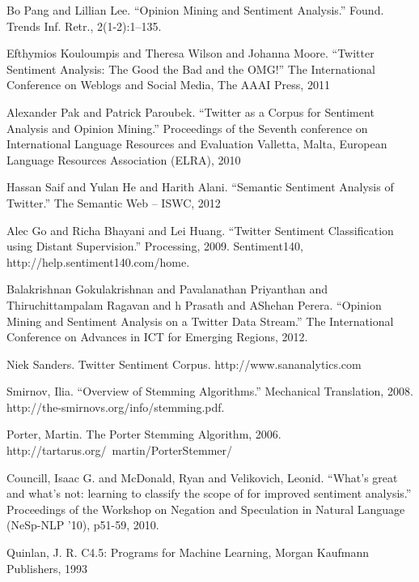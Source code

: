 	Bo Pang and Lillian Lee. “Opinion Mining and Sentiment Analysis.” Found. Trends Inf. Retr., 2(1-2):1–135.

	Efthymios Kouloumpis and Theresa Wilson and Johanna Moore. “Twitter Sentiment Analysis: The Good the Bad and the OMG!” The International Conference on Weblogs and Social Media, The AAAI Press, 2011

	Alexander Pak and Patrick Paroubek. “Twitter as a Corpus for Sentiment Analysis and Opinion Mining.” Proceedings of the Seventh conference on International Language Resources and Evaluation Valletta, Malta, European Language Resources Association (ELRA), 2010

	Hassan Saif and Yulan He and Harith Alani. “Semantic Sentiment Analysis of Twitter.” The Semantic Web – ISWC, 2012

	Alec Go and Richa Bhayani and Lei Huang. “Twitter Sentiment Classification
using Distant Supervision.” Processing, 2009. Sentiment140, http://help.sentiment140.com/home.

	Balakrishnan Gokulakrishnan and Pavalanathan Priyanthan and Thiruchittampalam Ragavan and h Prasath and AShehan Perera. “Opinion Mining and Sentiment Analysis on a Twitter Data Stream.” The International Conference on Advances in ICT for Emerging Regions, 2012.

	Niek Sanders. Twitter Sentiment Corpus. http://www.sananalytics.com

	Smirnov, Ilia. “Overview of Stemming Algorithms.” Mechanical Translation, 2008.
http://the-smirnovs.org/info/stemming.pdf.

	Porter, Martin. The Porter Stemming Algorithm, 2006. http://tartarus.org/~martin/PorterStemmer/

	Councill, Isaac G. and McDonald, Ryan and Velikovich, Leonid. “What's great and what's not: learning to classify the scope of for improved sentiment analysis.” Proceedings of the Workshop on Negation and Speculation in Natural Language (NeSp-NLP '10), p51-59, 2010.

	Quinlan, J. R. C4.5: Programs for Machine Learning, Morgan Kaufmann Publishers, 1993
